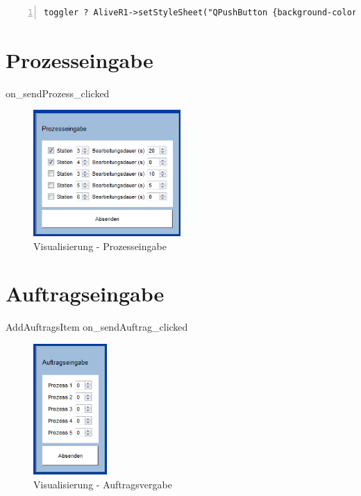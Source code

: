 \begin{lstlisting}[frame=single, breaklines=true, numbers=left, stepnumber=2, firstnumber=1, numberstyle = \tiny, caption=Stylesheet Aktualisierung der Alive-LED ,label=lst:LEDtoggle]
toggler ? AliveR1->setStyleSheet("QPushButton {background-color: rgb(0,250,50); border-radius: 6px;}") : AliveR1->setStyleSheet("QPushButton {background-color: green; border-radius: 6px;}");
\end{lstlisting}

\section{Prozesseingabe}
\label{sec:Prozesseingabe}

on_sendProzess_clicked

\begin{figure}[htb]
    \centering
    \includegraphics[width=0.5\textwidth]{Abbildungen/Prozesseingabe.png}
    \caption{Visualisierung - Prozesseingabe}		
    \label{fig:Prozesseingabe}
\end{figure}

\section{Auftragseingabe}
\label{sec:Auftragseingabe}

AddAuftragsItem
on_sendAuftrag_clicked

\begin{figure}[htb]
    \centering
    \includegraphics[width=0.25\textwidth]{Abbildungen/Auftragsvergabe.png}
    \caption{Visualisierung - Auftragsvergabe}		
    \label{fig:Auftragsvergabe}
\end{figure}



